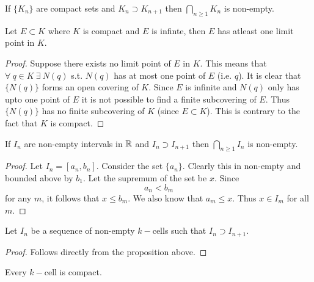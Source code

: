 \begin{corollary}
  If $\{K_n\}$ are compact sets and $K_n \supset K_{n+1}$ then $\bigcap_{n\geq 1} K_n$ is non-empty.
\end{corollary}
\begin{proposition}
  Let $E\subset K$ where $K$ is compact and $E$ is infinte, then $E$ has atleast one limit point in $K$.
\end{proposition}
\begin{proof}
  Suppose there exists no limit point of $E$ in $K$. This means that $\forall\ q\in K\ \exists\ N(q)$ s.t. $N(q)$ has at most one point of $E$ (i.e. $q$). It is clear that $\{N(q)\}$ forms an open covering of $K$. Since $E$ is infinite and $N(q)$ only has upto one point of $E$ it is not possible to find a finite subcovering of $E$. Thus $\{N(q)\}$ has no finite subcovering of $K$ (since $E\subset K$). This is contrary to the fact that $K$ is compact.
\end{proof}
\begin{proposition}
  If $I_n$ are non-empty intervals in $\mathbb{R}$ and $I_n \supset I_{n+1}$ then $\bigcap_{n\geq 1} I_n$ is non-empty.
\end{proposition}
\begin{proof}
  Let $I_n = [a_n,b_n]$. Consider the set $\{a_n\}$. Clearly this in non-empty and bounded above by $b_1$. Let the supremum of the set be $x$. Since
  \[a_n < b_m\]
  for any $m$, it follows that $x\leq b_m$. We also know that $a_m \leq x$. Thus $x\in I_m$ for all $m$.
\end{proof}
\begin{corollary}
  Let $I_n$ be a sequence of non-empty $k-$cells such that $I_n \supset I_{n+1}$.
\end{corollary}
\begin{proof}
  Follows directly from the proposition above.
\end{proof}
\begin{theorem}
  Every $k-$cell is compact.
\end{theorem}
